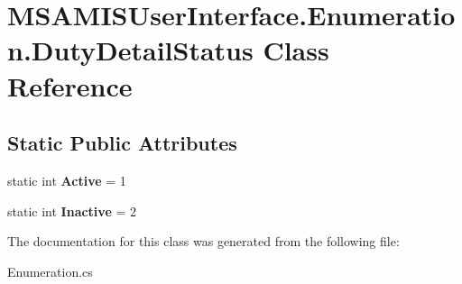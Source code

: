 \hypertarget{class_m_s_a_m_i_s_user_interface_1_1_enumeration_1_1_duty_detail_status}{}\section{M\+S\+A\+M\+I\+S\+User\+Interface.\+Enumeration.\+Duty\+Detail\+Status Class Reference}
\label{class_m_s_a_m_i_s_user_interface_1_1_enumeration_1_1_duty_detail_status}
\subsection*{Static Public Attributes}
\begin{DoxyCompactItemize}
\item 
\mbox{\label{class_m_s_a_m_i_s_user_interface_1_1_enumeration_1_1_duty_detail_status_a3a180d7e9636a6d946aec19665982e8f}} 
static int {\bfseries Active} = 1
\item 
\mbox{\label{class_m_s_a_m_i_s_user_interface_1_1_enumeration_1_1_duty_detail_status_adcf0c915f6e1cb56ebc91795ee45c515}} 
static int {\bfseries Inactive} = 2
\end{DoxyCompactItemize}


The documentation for this class was generated from the following file\+:\begin{DoxyCompactItemize}
\item 
Enumeration.\+cs\end{DoxyCompactItemize}
